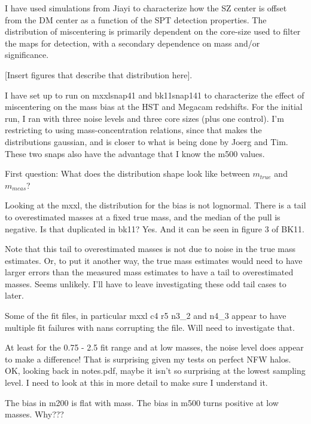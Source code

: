 \documentclass[11pt]{article}
\begin{document}
I have used simulations from Jiayi to characterize how the SZ center is offset from the DM center as a function of the SPT detection properties. The distribution of miscentering is primarily dependent on the core-size used to filter the maps for detection, with a secondary dependence on mass and/or significance.

[Insert figures that describe that distribution here].

I have set up to run on mxxlsnap41 and bk11snap141 to characterize the effect of miscentering on the mass bias at the HST and Megacam redshifts. For the initial run, I ran with three noise levels and three core sizes (plus one control). I'm restricting to using mass-concentration relations, since that makes the distributions gaussian, and is closer to what is being done by Joerg and Tim. These two snaps also have the advantage that I know the m500 values.


First question: What does the distribution shape look like between $m_{true}$ and $m_{meas}$?

Looking at the mxxl, the distribution for the bias is not lognormal. There is a tail to overestimated masses at a fixed true mass, and the median of the pull is negative.  Is that duplicated in bk11? Yes. And it can be seen in figure 3 of BK11.

Note that this tail to overestimated masses is not due to noise in the true mass estimates. Or, to put it another way, the true mass estimates would need to have larger errors than the measured mass estimates to have a tail to overestimated masses. Seems unlikely. I'll have to leave investigating these odd tail cases to later.

Some of the fit files, in particular mxxl c4 r5 n3\_2 and n4\_3 appear to have multiple fit failures with nans corrupting the file. Will need to investigate that.

At least for the 0.75 - 2.5 fit range and at low masses, the noise level does appear to make a difference! That is surprising given my tests on perfect NFW halos.  OK, looking back in notes.pdf, maybe it isn't so surprising at the lowest sampling level. I need to look at this in more detail to make sure I understand it.



The bias in m200 is flat with mass. The bias in m500 turns positive at low masses. Why??? 




\clearpage \newpage
\end{document}

